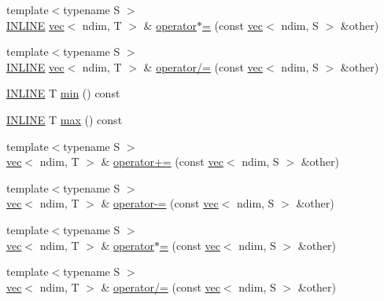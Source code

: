 \begin{DoxyCompactItemize}
\item 
{\footnotesize template$<$typename S $>$ }\\\hyperlink{common_8hpp_a2eb6f9e0395b47b8d5e3eeae4fe0c116}{I\+N\+L\+I\+NE} \hyperlink{structshark_1_1ndim_1_1vec}{vec}$<$ ndim, T $>$ \& \hyperlink{structshark_1_1ndim_1_1vec_a3b6b703d38be32f4d543718743026582}{operator$\ast$=} (const \hyperlink{structshark_1_1ndim_1_1vec}{vec}$<$ ndim, S $>$ \&other)
\item 
{\footnotesize template$<$typename S $>$ }\\\hyperlink{common_8hpp_a2eb6f9e0395b47b8d5e3eeae4fe0c116}{I\+N\+L\+I\+NE} \hyperlink{structshark_1_1ndim_1_1vec}{vec}$<$ ndim, T $>$ \& \hyperlink{structshark_1_1ndim_1_1vec_a640e4ea895ad8b14a259249227bc9290}{operator/=} (const \hyperlink{structshark_1_1ndim_1_1vec}{vec}$<$ ndim, S $>$ \&other)
\item 
\hyperlink{common_8hpp_a2eb6f9e0395b47b8d5e3eeae4fe0c116}{I\+N\+L\+I\+NE} T \hyperlink{structshark_1_1ndim_1_1vec_a8db2f3a20f6cbf6cc2ebf9ecb00e0cc4}{min} () const
\item 
\hyperlink{common_8hpp_a2eb6f9e0395b47b8d5e3eeae4fe0c116}{I\+N\+L\+I\+NE} T \hyperlink{structshark_1_1ndim_1_1vec_aabdbb224acc832abb50f9a0ab739533a}{max} () const
\item 
{\footnotesize template$<$typename S $>$ }\\\hyperlink{structshark_1_1ndim_1_1vec}{vec}$<$ ndim, T $>$ \& \hyperlink{structshark_1_1ndim_1_1vec_af89f86b8ee43b2c1a0adb9bd8223d548}{operator+=} (const \hyperlink{structshark_1_1ndim_1_1vec}{vec}$<$ ndim, S $>$ \&other)
\item 
{\footnotesize template$<$typename S $>$ }\\\hyperlink{structshark_1_1ndim_1_1vec}{vec}$<$ ndim, T $>$ \& \hyperlink{structshark_1_1ndim_1_1vec_accad5ec69cc6833eae34802f1a7c81ac}{operator-\/=} (const \hyperlink{structshark_1_1ndim_1_1vec}{vec}$<$ ndim, S $>$ \&other)
\item 
{\footnotesize template$<$typename S $>$ }\\\hyperlink{structshark_1_1ndim_1_1vec}{vec}$<$ ndim, T $>$ \& \hyperlink{structshark_1_1ndim_1_1vec_af52bce704e4bd632c3844614007ca5ce}{operator$\ast$=} (const \hyperlink{structshark_1_1ndim_1_1vec}{vec}$<$ ndim, S $>$ \&other)
\item 
{\footnotesize template$<$typename S $>$ }\\\hyperlink{structshark_1_1ndim_1_1vec}{vec}$<$ ndim, T $>$ \& \hyperlink{structshark_1_1ndim_1_1vec_a9b9aa95a9329ad2877f57c62774063e1}{operator/=} (const \hyperlink{structshark_1_1ndim_1_1vec}{vec}$<$ ndim, S $>$ \&other)
\end{DoxyCompactItemize}
